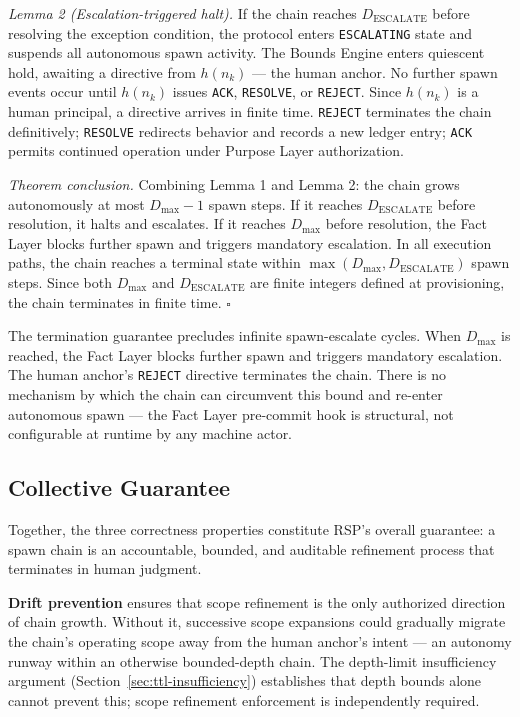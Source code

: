 \medskip\noindent\textit{Lemma 2 (Escalation-triggered halt).}  If the chain
reaches $D_{\mathrm{ESCALATE}}$ before resolving the exception condition, the
protocol enters \texttt{ESCALATING} state and suspends all autonomous spawn
activity.  The Bounds Engine enters quiescent hold, awaiting a directive from
$h(n_k)$ --- the human anchor.  No further spawn events occur until $h(n_k)$
issues \texttt{ACK}, \texttt{RESOLVE}, or \texttt{REJECT}.  Since $h(n_k)$ is a
human principal, a directive arrives in finite time.  \texttt{REJECT} terminates
the chain definitively; \texttt{RESOLVE} redirects behavior and records a new
ledger entry; \texttt{ACK} permits continued operation under Purpose Layer
authorization.

\medskip\noindent\textit{Theorem conclusion.}  Combining Lemma 1 and Lemma 2:
the chain grows autonomously at most $D_{\max} - 1$ spawn steps.  If it reaches
$D_{\mathrm{ESCALATE}}$ before resolution, it halts and escalates.  If it
reaches $D_{\max}$ before resolution, the Fact Layer blocks further spawn and
triggers mandatory escalation.  In all execution paths, the chain reaches a
terminal state within $\max(D_{\max}, D_{\mathrm{ESCALATE}})$ spawn steps.
Since both $D_{\max}$ and $D_{\mathrm{ESCALATE}}$ are finite integers defined at
provisioning, the chain terminates in finite time.  $\square$

The termination guarantee precludes infinite spawn-escalate cycles.  When
$D_{\max}$ is reached, the Fact Layer blocks further spawn and triggers mandatory
escalation.  The human anchor's \texttt{REJECT} directive terminates the chain.
There is no mechanism by which the chain can circumvent this bound and re-enter
autonomous spawn --- the Fact Layer pre-commit hook is structural, not
configurable at runtime by any machine actor.

\subsection{Collective Guarantee}
\label{sec:rs-collective-guarantee}

Together, the three correctness properties constitute RSP's overall guarantee:
a spawn chain is an accountable, bounded, and auditable refinement process that
terminates in human judgment.

\medskip\textbf{Drift prevention} ensures that scope refinement is the only
authorized direction of chain growth.  Without it, successive scope expansions
could gradually migrate the chain's operating scope away from the human anchor's
intent --- an autonomy runway within an otherwise bounded-depth chain.  The
depth-limit insufficiency argument (Section~\ref{sec:ttl-insufficiency})
establishes that depth bounds alone cannot prevent this; scope refinement
enforcement is independently required.

